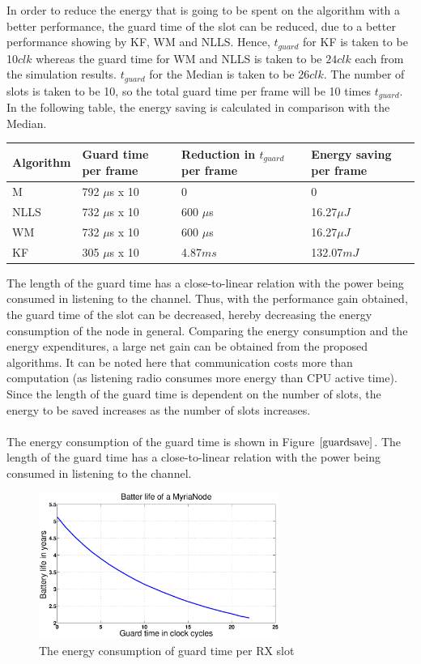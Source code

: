 \documentclass[a4paper,10pt]{report}
\begin{document}
In order to reduce the energy that is going to be spent on the algorithm with a better performance, the guard time of the slot can be reduced, due to a better performance showing by KF, WM and NLLS. 
Hence, $t_{guard}$ for KF is taken to be 10$clk$ whereas the guard time for WM and NLLS is taken to be $24clk$ each from the simulation results. $t_{guard}$ for the Median is taken to be 26$clk$. The number of slots is taken to be 10, so the total guard time per frame will be 10 times $t_{guard}$. In the following table, the energy saving is calculated in comparison with the Median. 
\begin{center}
    \begin{tabular}{ |p{1.5cm} | p{2cm} |p{2cm} | p{1.75cm} |  }
    \hline
    Algorithm & Guard time per frame & Reduction in $t_{guard}$ per frame & Energy saving per frame\\ \hline
    M &  792 $\mu$s x 10 & 0 & 0 \\ \hline
    NLLS & 732 $\mu$s x 10 & 600 $\mu$s & 16.27$\mu J$\\ \hline
    WM &   732 $\mu$s x 10 & 600 $\mu$s & 16.27$\mu J$ \\ \hline
    KF &  305 $\mu$s x 10 & 4.87$ms$ & 132.07$mJ$\\ \hline
    \end{tabular}
\label{tab}
\end{center}
The length of the guard time has a close-to-linear relation with the power being consumed in listening to the channel. Thus, with the performance gain obtained, the guard time of the slot can be decreased, hereby decreasing the energy consumption of the node in general. Comparing the energy consumption and the energy expenditures, a large net gain can be obtained from the proposed algorithms. It can be noted here that communication costs more than computation (as listening radio consumes more energy than CPU active time). Since the length of the guard time is dependent on the number of slots, the energy to be saved increases as the number of slots increases.\paragraph*{}
The energy consumption of the guard time is shown in Figure $\ref{guardsave}$. The length of the guard time has a close-to-linear relation with the power being consumed in listening to the channel.
\begin{figure}
\centering
\includegraphics[width=0.7\textwidth]{guardsave}
\caption{The energy consumption of guard time per RX slot}
\label{guardsave}
\end{figure}
\end{document}
